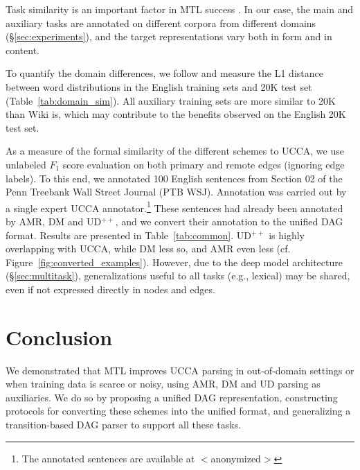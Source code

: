 \documentclass[11pt,a4paper]{article}
\begin{document}
Task similarity is an important factor in MTL success
\cite{E17-2026,E17-1005}.
In our case, the main and auxiliary tasks are annotated on different corpora
from different domains (\S\ref{sec:experiments}), and
the target representations vary both in form and in content.

To quantify the domain differences, we follow \citet{Plank2011EffectiveMO} and measure the L1 distance 
between word distributions in the English training sets and 20K test set
(Table~\ref{tab:domain_sim}).
All auxiliary training sets are more similar to 20K than Wiki is, which may
contribute to the benefits observed on the English 20K test set.

As a measure of the formal similarity of the different schemes to UCCA,
we use unlabeled $F_1$ score evaluation on both primary and remote edges (ignoring edge labels).
To this end, we annotated 100 English sentences from Section 02 of the Penn Treebank Wall Street Journal
(PTB WSJ).
Annotation was carried out by a single expert UCCA annotator.\footnote{The annotated sentences are 
available at $<$anonymized$>$}
These sentences had already been annotated by AMR, DM and UD$^{++}$,
and we convert their annotation to the unified DAG format.
Results are presented in Table~\ref{tab:common}.
UD$^{++}$ is highly overlapping with UCCA, while DM less so, and AMR even less
(cf. Figure~\ref{fig:converted_examples}).
However, due to the deep model architecture (\S\ref{sec:multitask}),
generalizations useful to all tasks (e.g., lexical) may be shared,
even if not expressed directly in nodes and edges.


\section{Conclusion}\label{sec:conclusion}

We demonstrated that MTL improves UCCA parsing in out-of-domain settings or when training data is scarce or noisy,
using AMR, DM and UD parsing as auxiliaries.
We do so by proposing a unified DAG representation, constructing protocols for converting these schemes into the unified format,
and generalizing a transition-based DAG parser to support all these tasks.
\end{document}
